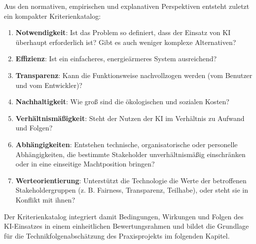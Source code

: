 Aus den normativen, empirischen und explanativen Perspektiven entsteht zuletzt ein kompakter Kriterienkatalog:

\begin{enumerate}[noitemsep,topsep=5pt]
    \item \textbf{Notwendigkeit}: Ist das Problem so definiert, dass der Einsatz von KI überhaupt erforderlich ist? Gibt es auch weniger komplexe Alternativen?
    \item \textbf{Effizienz}: Ist ein einfacheres, energieärmeres System ausreichend?
    \item \textbf{Transparenz}: Kann die Funktionsweise nachvollzogen werden (vom Benutzer und vom Entwickler)?
    \item \textbf{Nachhaltigkeit}: Wie groß sind die ökologischen und sozialen Kosten?
    \item \textbf{Verhältnismäßigkeit}: Steht der Nutzen der KI im Verhältnis zu Aufwand und Folgen?
    \item \textbf{Abhängigkeiten}: Entstehen technische, organisatorische oder personelle Abhängigkeiten, die bestimmte Stakeholder unverhältnismäßig einschränken oder in eine einseitige Machtposition bringen?
    \item \textbf{Werteorientierung}: Unterstützt die Technologie die Werte der betroffenen Stakeholdergruppen (z. B. Fairness, Transparenz, Teilhabe), oder steht sie in Konflikt mit ihnen?
\end{enumerate}

Der Kriterienkatalog integriert damit Bedingungen, Wirkungen und Folgen des KI-Einsatzes in einem einheitlichen Bewertungsrahmen und bildet die Grundlage für die Technikfolgenabschätzung des Praxisprojekts im folgenden Kapitel.